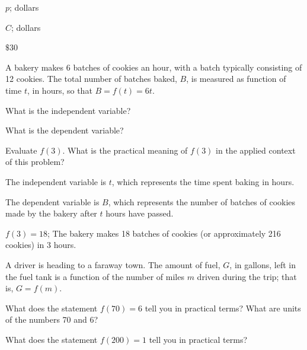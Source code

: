 \begin{solution}

\begin{parts}
\item $p$; dollars
\item $C$; dollars
\item $\$30$
\end{parts}
\end{solution}








\begin{exercise}
A bakery makes 6 batches of cookies an hour, with a batch typically consisting of 12 cookies. The total number of batches baked, $B$, is measured as function of time $t$, in hours, so that $B=f(t)=6t$.


\begin{parts}
\item What is the independent variable?
\item What is the dependent variable?
\item Evaluate $f(3)$. What is the practical meaning of $f(3)$ in the applied context of this problem?
\end{parts}

\end{exercise}





\begin{solution}

\begin{parts}
\item The independent variable is $t$, which represents the time spent baking in hours.
\item The dependent variable is $B$, which represents the number of batches of cookies made by the bakery after $t$ hours have passed.
\item $f(3)=18$; The bakery makes 18 batches of cookies (or approximately 216 cookies) in 3 hours.
\end{parts}
\end{solution}











\begin{exercise}
A driver is heading to a faraway town. The amount of fuel, $G$, in gallons, left in the fuel tank is a function of the number of miles $m$ driven during the trip; that is, $G=f(m)$.


\begin{parts}

\item What does the statement $f(70)=6$ tell you in practical terms? What are units of the numbers 70 and 6?

\item What does the statement  $f(200)=1$ tell you in practical terms?
\end{parts}
\end{exercise}



